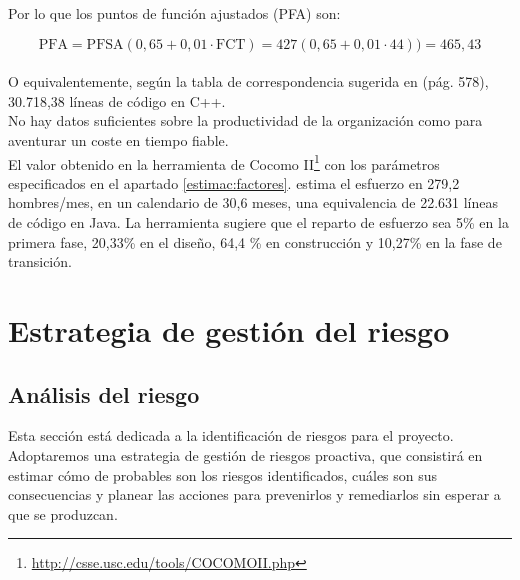 \documentclass[11pt, a4paper, twoside, titlepage]{article}
\begin{document}
		Por lo que los puntos de función ajustados (PFA) son:

	\begin{equation}
		\mathrm{PFA} = \mathrm{PFSA} (0,65 + 0,01 \cdot \mathrm{FCT}) = 427 (0,65 + 0,01 \cdot 44)) = 465,43 \tag{PFA}
	\end{equation}\\

		O equivalentemente, según la tabla de correspondencia sugerida en \cite{PSMAN} (pág. 578), 30.718,38 líneas de código en C++.\\

		No hay datos suficientes sobre la productividad de la organización como para aventurar un coste en tiempo fiable.\\

		El valor obtenido en la herramienta de Cocomo II\footnote{\url{http://csse.usc.edu/tools/COCOMOII.php}} con los parámetros especificados en el apartado \ref{estimac:factores}. estima el esfuerzo en 279,2 hombres/mes, en un calendario de 30,6 meses, una equivalencia de 22.631 líneas de código en Java. La herramienta sugiere que el reparto de esfuerzo sea 5\% en la primera fase, 20,33\% en el diseño, 64,4 \% en construcción y 10,27\% en la fase de transición.
			
	\section{Estrategia de gestión del riesgo}
		\subsection{Análisis del riesgo}
		Esta sección está dedicada a la identificación de riesgos para el proyecto. Adoptaremos una estrategia de gestión de riesgos proactiva, que consistirá en estimar cómo de probables son los riesgos identificados, cuáles son sus consecuencias y planear las acciones para prevenirlos y remediarlos sin esperar a que se produzcan.\\
		
\end{document}

